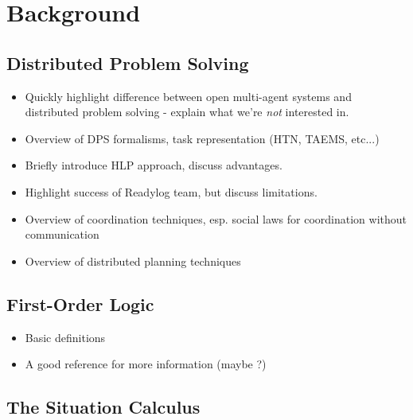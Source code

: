\chapter{Background}\label{ch:background}

\section{Distributed Problem Solving}

\begin{itemize}
\item Quickly highlight difference between open multi-agent systems and
distributed problem solving - explain what we're \emph{not} interested in.
\item Overview of DPS formalisms, task representation (HTN, TAEMS, etc...)
\item Briefly introduce HLP approach, discuss advantages.
\item Highlight success of Readylog team, but discuss limitations.
\item Overview of coordination techniques, esp. social laws for coordination without communication
\item Overview of distributed planning techniques \cite{desjardins99survey_dist_planning}
\end{itemize}

\section{First-Order Logic}

\begin{itemize}
\item Basic definitions
\item A good reference for more information (maybe \cite{fitting96fol_book}?)
\end{itemize}

\section{The Situation Calculus}

